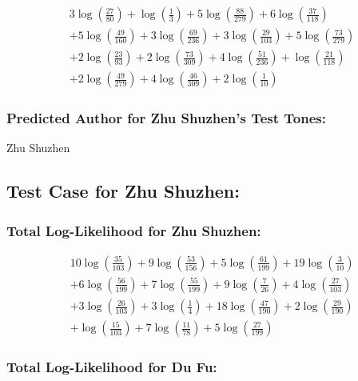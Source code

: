 \documentclass[12pt]{article}
\begin{document}
\begin{align*}
& 3 \log\left(\frac{27}{80}\right) + \log\left(\frac{1}{3}\right) + 5 \log\left(\frac{88}{279}\right) + 6 \log\left(\frac{37}{118}\right) \\
& + 5 \log\left(\frac{49}{160}\right) + 3 \log\left(\frac{69}{236}\right) + 3 \log\left(\frac{29}{103}\right) + 5 \log\left(\frac{73}{279}\right) \\
& + 2 \log\left(\frac{23}{93}\right) + 2 \log\left(\frac{73}{309}\right) + 4 \log\left(\frac{51}{236}\right) + \log\left(\frac{21}{118}\right) \\
& + 2 \log\left(\frac{49}{279}\right) + 4 \log\left(\frac{46}{309}\right) + 2 \log\left(\frac{1}{10}\right)
\end{align*}

\subsubsection*{Predicted Author for Zhu Shuzhen's Test Tones:}
Zhu Shuzhen

\subsection*{Test Case for Zhu Shuzhen: }

\subsubsection*{Total Log-Likelihood for Zhu Shuzhen:}

\begin{align*}
& 10 \log\left(\frac{35}{103}\right) + 9 \log\left(\frac{53}{156}\right) + 5 \log\left(\frac{61}{199}\right) + 19 \log\left(\frac{3}{10}\right) \\
& + 6 \log\left(\frac{56}{199}\right) + 7 \log\left(\frac{55}{199}\right) + 9 \log\left(\frac{7}{26}\right) + 4 \log\left(\frac{27}{103}\right) \\
& + 3 \log\left(\frac{26}{103}\right) + 3 \log\left(\frac{1}{4}\right) + 18 \log\left(\frac{47}{190}\right) + 2 \log\left(\frac{29}{190}\right) \\
& + \log\left(\frac{15}{103}\right) + 7 \log\left(\frac{11}{78}\right) + 5 \log\left(\frac{27}{199}\right)
\end{align*}

\subsubsection*{Total Log-Likelihood for Du Fu:}
\end{document}
